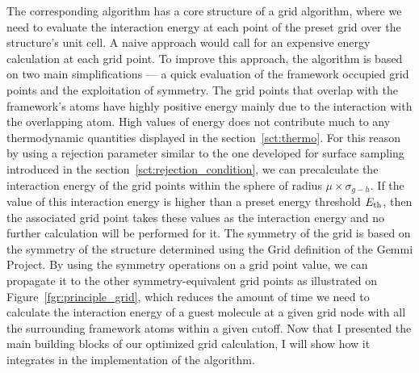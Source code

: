 \documentclass[main]{subfiles}
\begin{document}
The corresponding algorithm has a core structure of a grid algorithm, where we need to evaluate the interaction energy at each point of the preset grid over the structure's unit cell. A naive approach would call for an expensive energy calculation at each grid point. To improve this approach, the algorithm is based on two main simplifications --- a quick evaluation of the framework occupied grid points and the exploitation of symmetry. The grid points that overlap with the framework's atoms have highly positive energy mainly due to the interaction with the overlapping atom. High values of energy does not contribute much to any thermodynamic quantities displayed in the section~\ref{sct:thermo}. For this reason by using a rejection parameter similar to the one developed for surface sampling introduced in the section~\ref{sct:rejection_condition}, we can precalculate the interaction energy of the grid points within the sphere of radius $\mu\times\sigma_{g-h}$. If the value of this interaction energy is higher than a preset energy threshold $E_{\text{th}}$, then the associated grid point takes these values as the interaction energy and no further calculation will be performed for it. The symmetry of the grid is based on the symmetry of the structure determined using the Grid definition of the Gemmi Project. By using the symmetry operations on a grid point value, we can propagate it to the other symmetry-equivalent grid points as illustrated on Figure~\ref{fgr:principle_grid}, which reduces the amount of time we need to calculate the interaction energy of a guest molecule at a given grid node with all the surrounding framework atoms within a given cutoff. Now that I presented the main building blocks of our optimized grid calculation, I will show how it integrates in the implementation of the algorithm.
\end{document}
